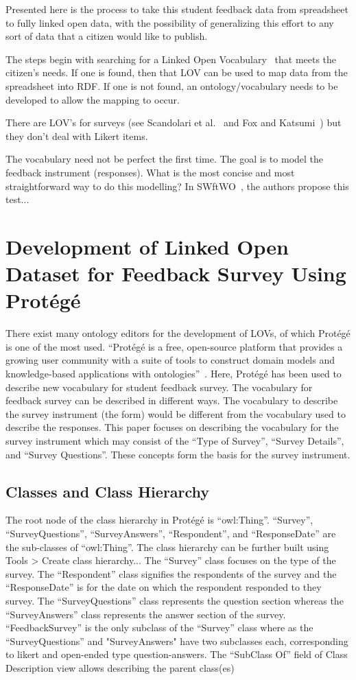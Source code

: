 \documentclass[runningheads]{llncs}
\begin{document}
Presented here is the process to take this student feedback data from spreadsheet to 
fully linked open data, 
with the possibility of generalizing this effort to any sort of data that a 
citizen would like to publish.

The steps begin with searching for a Linked Open Vocabulary~\cite{gateway} that meets the citizen's needs.
If one is found, then that LOV can be used to map data from the spreadsheet into RDF. If one is not found, an ontology/vocabulary needs to be developed to allow the mapping to occur.

There are LOV's for surveys (see Scandolari et al.~\cite{ontology} and Fox and Katsumi~\cite{fox}) but they don't deal with Likert items.

The vocabulary need not be perfect the first time. The goal is to model the feedback instrument (responses). What is the most concise and most straightforward way to do this modelling? In SWftWO~\cite{swftwo}, the authors propose this test... 

\section{Development of Linked Open Dataset for Feedback Survey Using Protégé}
There exist many ontology editors for the development of LOVs, of which Protégé is one of the most used. ``Protégé is a free, open-source platform that provides a growing user community with a suite of tools to construct domain models and knowledge-based applications with ontologies''~\cite{protege}. 
Here, Protégé has been used to describe new vocabulary for student feedback survey. 
The vocabulary for feedback survey can be described in different ways. 
The vocabulary to describe the survey instrument (the form) 
would be different from the vocabulary used to describe the responses. 
This paper focuses on describing the vocabulary for the survey instrument which may consist of the ``Type of Survey'', ``Survey Details'', and ``Survey Questions''. 
These concepts form the basis for the survey instrument.

\subsection{Classes and Class Hierarchy}
The root node of the class hierarchy in Protégé is ``owl:Thing''. ``Survey'', ``SurveyQuestions'',  ``SurveyAnswers'', ``Respondent'', and ``ResponseDate'' are the sub-classes of ``owl:Thing''. 
The class hierarchy can be further built using Tools > Create class hierarchy... 
The ``Survey'' class focuses on the type of the survey. 
The ``Respondent'' class signifies the respondents of the survey and the ``ResponseDate'' is for the date on which the respondent responded to they survey. The ``SurveyQuestions'' class represents 
the question section whereas the ``SurveyAnswers'' class represents 
the answer section of the survey. ``FeedbackSurvey'' is the only subclass of the ``Survey'' class where as the ``SurveyQuestions'' and "SurveyAnswers" have two subclasses each, corresponding to likert and open-ended type question-answers.
The ``SubClass Of'' field of Class Description view allows describing the parent class(es)
\end{document}

